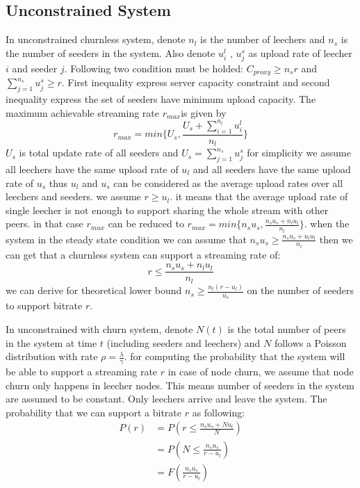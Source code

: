 \documentclass[paper]{ieice}
\begin{document}
\subsection{Unconstrained System}
In unconstrained churnless system, denote $n_l$ is the number of leechers and $n_s$ is the number of seeders in the system.
Also denote $u_{i}^{l}$ , $u_{j}^{s}$ as upload rate of leecher $i$ and seeder $j$.
Following two condition must be holded: $C_{proxy}\ge n_s r$ and $\sum_{j=1}^{n_s} u_{j}^{s} \ge r$.
First inequality express server capacity constraint and second inequality express the set of seeders have minimum upload capacity.
The maximum achievable streaming rate $r_{max}$is given by
\begin{equation}
	r_{max} = min \{ {{U_s},\frac{U_s + \sum_{i=1}^{n_l} u_{i}^{l}}{n_l}} \}
\end{equation}
$U_s$ is total update rate of all seeders and $U_s=\sum_{j=1}^{n_s}u_{j}^{s}$
for simplicity we assume all leechers have the same upload rate of $u_l$ and all seeders have the same upload rate of $u_s$ thus $u_l$ and $u_s$ can be considered as the average upload rates over all leechers and seeders.  
we assume $r \ge u_l$. it means that the average upload rate of single leecher is not enough to support sharing the whole stream with other peers.
in that case $r_{max}$ can be reduced to $r_{max}=min\{n_s u_s,\frac{n_s u_s + n_l u_l}{n_l}\}$. 
when the system in the steady state condition we can assume that $n_s u_s \ge \frac{n_s u_s + u_l u_l }{n_l}$ then we can get that a churnless system can support 
a streaming rate of:
\begin{equation}
	r \le \frac{n_s u_s + n_l u_l}{n_l}
\end{equation}
we can derive for theoretical lower bound $n_s \ge \frac{n_l(r-u_l)}{u_s}$ on the number of seeders to support bitrate $r$.

In unconstrained with churn system, denote $N(t)$ is the total number of peers in the system at time $t$ (including seeders and leechers) and $N$ follows a Poisson distribution with rate $\rho = \frac{\lambda}{\gamma}$.
for computing the probability that the system will be able to support a streaming rate $r$ in case of node churn, we assume that node churn only happens in leecher nodes. This means number of seeders in the system are assumed to be constant. Only leechers arrive and leave the system.
The probability that we can support a bitrate $r$ as following:
\begin{align*}
  P(r) &= P(r \le \frac{n_s u_s + N u_l}{N}) \\
  &=P(N \le \frac{n_s u_s}{r - u_l}) \\
  &=F(\frac{n_s u_s}{r - u_l})
\end{align*}
\end{document}
